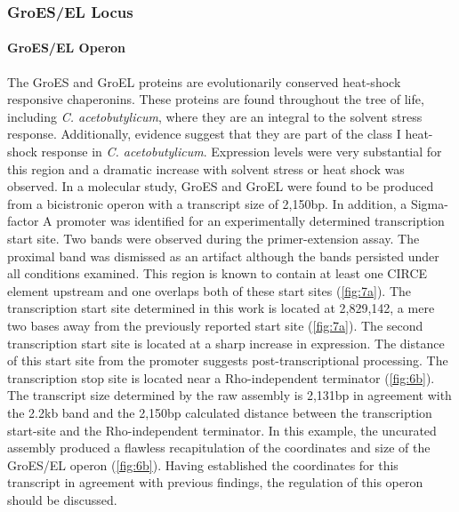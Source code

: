 \subsubsection{GroES/EL Locus}
\paragraph{GroES/EL Operon}
The GroES and GroEL proteins are evolutionarily conserved heat-shock responsive chaperonins. These proteins are found throughout the tree of life, including \textit{C. acetobutylicum}, where they are an integral to the solvent stress response\cite{73,74,75}. Additionally, evidence suggest that they are part of the class I heat-shock response in \textit{C. acetobutylicum}\cite{42}. Expression levels were very substantial for this region and a dramatic increase with solvent stress or heat shock was observed\cite{73,74}. In a molecular study, GroES and GroEL were found to be produced from a bicistronic operon with a transcript size of 2,150bp\cite{75}. In addition, a Sigma-factor A promoter was identified for an experimentally determined transcription start site. Two bands were observed during the primer-extension assay\cite{75}. The proximal band was dismissed as an artifact although the bands persisted under all conditions examined\cite{75}. This region is known to contain at least one CIRCE element upstream\cite{76} and one overlaps both of these start sites (\ref{fig:7a})\cite{74}. The transcription start site determined in this work is located at 2,829,142, a mere two bases away from the previously reported start site\cite{75} (\ref{fig:7a}). The second transcription start site is located at a sharp increase in expression. The distance of this start site from the promoter suggests post-transcriptional processing. The transcription stop site is located near a Rho-independent terminator (\ref{fig:6b}). The transcript size determined by the raw assembly is 2,131bp in agreement with the 2.2kb band and the 2,150bp calculated distance between the transcription start-site and the Rho-independent terminator\cite{75}. In this example, the uncurated assembly produced a flawless recapitulation of the coordinates and size of the GroES/EL operon (\ref{fig:6b}). Having established the coordinates for this transcript in agreement with previous findings, the regulation of this operon should be discussed.

